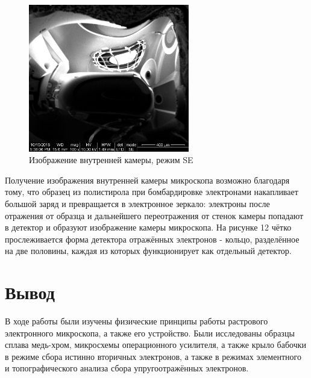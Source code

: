 \documentclass[a4paper]{article}
\begin{document}
\begin{enumerate}
\begin{figure}[h]
\begin{center}
\includegraphics[width=7cm]{iv1_001.jpg}
\caption{Изображение внутренней камеры, режим SE}
\label{ris:experimoriginal} %
\end{center}
\end{figure}

Получение изображения внутренней камеры микроскопа возможно благодаря тому, что образец из полистирола при бомбардировке электронами накапливает большой заряд и превращается в электронное
зеркало: электроны после отражения от образца и дальнейшего переотражения от стенок камеры попадают в детектор и образуют изображение камеры микроскопа. На рисунке 12 чётко прослеживается форма детектора отражённых электронов - кольцо, разделённое на две половины, каждая из которых функционирует как отдельный детектор.

\end{enumerate}

\section{Вывод}

В ходе работы были изучены физические принципы работы растрового электронного микроскопа, а также его устройство. Были исследованы образцы сплава медь-хром, микросхемы операционного усилителя, а также крыло бабочки в режиме сбора истинно вторичных электронов, а также в режимах элементного и топографического анализа сбора упругоотражённых электронов.
\end{document}
